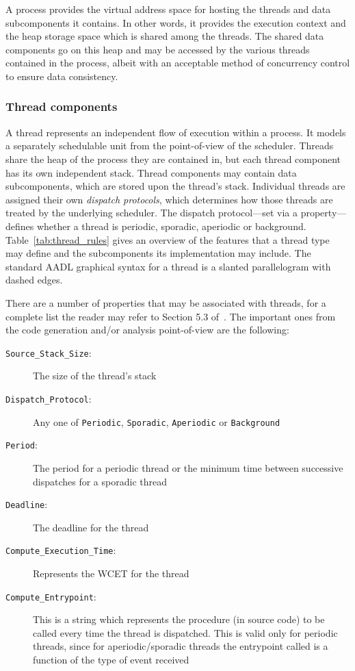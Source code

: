 A process provides the virtual address space for hosting the threads
and data subcomponents it contains. In other words, it provides the
execution context and the heap storage space which is shared among the
threads. The shared data components go on this heap and may be
accessed by the various threads contained in the process, albeit with
an acceptable method of concurrency control to ensure data
consistency.

\subsubsection{Thread components} A thread represents an independent
flow of execution within a process. It models a separately schedulable
unit from the point-of-view of the scheduler. Threads share the heap
of the process they are contained in, but each thread component has
its own independent stack. Thread components may contain data
subcomponents, which are stored upon the thread's stack. Individual
threads are assigned their own \emph{dispatch protocols}, which
determines how those threads are treated by the underlying
scheduler. The dispatch protocol---set via a property---defines
whether a thread is periodic, sporadic, aperiodic or
background. Table~\ref{tab:thread_rules} gives an overview of the
features that a thread type may define and the subcomponents its
implementation may include. The standard AADL graphical syntax for a
thread is a slanted parallelogram with dashed edges. 

There are a number of properties that may be associated with threads,
for a complete list the reader may refer to Section 5.3
of~\cite{AS5506}. The important ones from the code generation and/or
analysis point-of-view are the following:

\begin{description}
\item[\texttt{Source\_Stack\_Size}:]{The size of the thread's stack}
\item[\texttt{Dispatch\_Protocol}:]{Any one of \texttt{Periodic},
  \texttt{Sporadic}, \texttt{Aperiodic} or \texttt{Background}}
\item[\texttt{Period}:]{The period for a periodic thread or the
  minimum time between successive dispatches for a sporadic thread}
\item[\texttt{Deadline}:]{The deadline for the thread}
\item[\texttt{Compute\_Execution\_Time}:]{Represents the WCET for the
  thread}
\item[\texttt{Compute\_Entrypoint}:]{This is a string which represents
  the procedure (in source code) to be called every time the thread is
  dispatched. This is valid only for periodic threads, since for
  aperiodic/sporadic threads the entrypoint called is a function of
  the type of event received}
\end{description}

